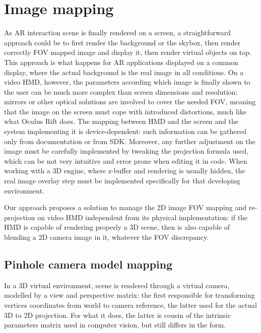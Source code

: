 \section{Image mapping}
As AR interaction scene is finally rendered on a screen, a straightforward approach could be to first render the background or the skybox, then render correctly FOV mapped image and display it, then render virtual objects on top. This approach is what happens for AR applications displayed on a common display, where the actual background is the real image in all conditions. On a video HMD, however, the parameters according which image is finally shown to the user can be much more complex than screen dimensions and resolution: mirrors or other optical solutions are involved to cover the needed FOV, meaning that the image on the screen must cope with introduced distortions, much like what Oculus Rift does. The mapping between HMD and the screen and the system implementing it is device-dependent: such information can be gathered only from documentation or from SDK. Moreover, any further adjustment on the image must be carefully implemented by tweaking the projection formula used, which can be not very intuitive and error prone when editing it in code. When working with a 3D engine, where z-buffer and rendering is usually hidden, the real image overlay step must be implemented specifically for that developing environment.

Our approach proposes a solution to manage the 2D image FOV mapping and re-projection on video HMD independent from its physical implementation: if the HMD is capable of rendering properly a 3D scene, then is also capable of blending a 2D camera image in it, whatever the FOV discrepancy.

\subsection{Pinhole camera model mapping}
In a 3D virtual environment, scene is rendered through a virtual camera, modelled by a view and perspective matrix: the first responsible for transforming vertices coordinates from world to camera reference, the latter used for the actual 3D to 2D projection. For what it does, the latter is cousin of the intrinsic parameters matrix used in computer vision, but still differs in the form.

